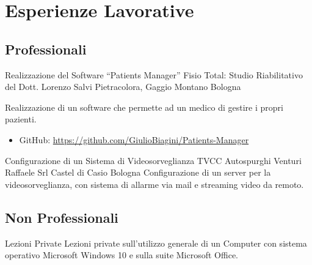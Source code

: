 %
%
%
%
%
%



\section{Esperienze Lavorative}

\subsection{Professionali}

{Realizzazione del Software ``Patients Manager''}
{Fisio Total: Studio Riabilitativo del Dott. Lorenzo Salvi}
{Pietracolora, Gaggio Montano}
{Bologna}
{Realizzazione di un software che permette ad un medico di gestire i propri
pazienti.
\begin{itemize}
	\item GitHub: \url{https://github.com/GiulioBiagini/Patients-Manager}
\end{itemize}}

{Configurazione di un Sistema di Videosorveglianza TVCC}
{Autospurghi Venturi Raffaele Srl}
{Castel di Casio}
{Bologna}
{Configurazione di un server per la videosorveglianza, con sistema di allarme
via mail e streaming video da remoto.}



\subsection{Non Professionali}

{Lezioni Private}
{}
{}
{}
{Lezioni private sull'utilizzo generale di un Computer con sistema operativo
Microsoft Windows 10 e sulla suite Microsoft Office.}

